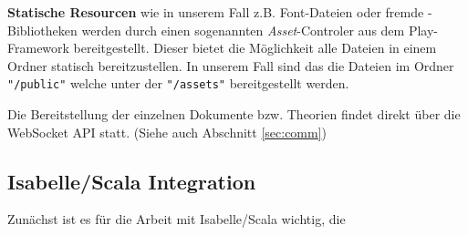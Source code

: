 \textbf{Statische Resourcen} wie in unserem Fall z.B. Font-Dateien oder fremde -Bibliotheken
werden durch einen sogenannten \textit{Asset}-Controler aus dem Play-Framework bereitgestellt.
Dieser bietet die Möglichkeit alle Dateien in einem Ordner statisch bereitzustellen. In unserem Fall
sind das die Dateien im Ordner \texttt{"/public"} welche unter der  \texttt{"/assets"}
bereitgestellt werden.

Die Bereitstellung der einzelnen Dokumente bzw. Theorien findet direkt über die WebSocket API statt.
(Siehe auch Abschnitt \ref{sec:comm})

\subsection{Isabelle/Scala Integration}

Zunächst ist es für die Arbeit mit Isabelle/Scala wichtig, die 

